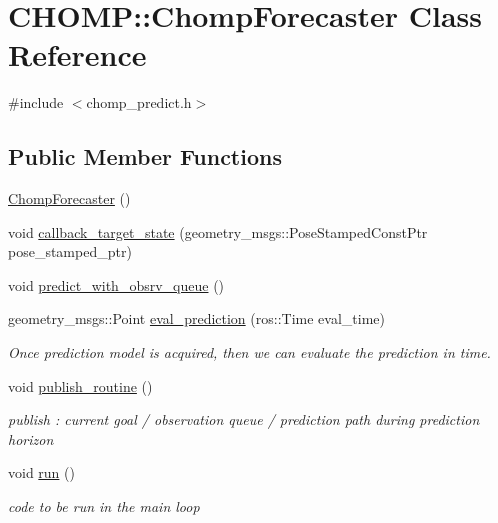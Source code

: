 \hypertarget{class_c_h_o_m_p_1_1_chomp_forecaster}{}\section{C\+H\+O\+MP\+:\+:Chomp\+Forecaster Class Reference}
\label{class_c_h_o_m_p_1_1_chomp_forecaster}


{\ttfamily \#include $<$chomp\+\_\+predict.\+h$>$}

\subsection*{Public Member Functions}
\begin{DoxyCompactItemize}
\item 
\hyperlink{class_c_h_o_m_p_1_1_chomp_forecaster_a58176b34170de8485029f182e05f12c5}{Chomp\+Forecaster} ()
\item 
void \hyperlink{class_c_h_o_m_p_1_1_chomp_forecaster_ac05e634464c8859c8cc3e8bdb1a40ded}{callback\+\_\+target\+\_\+state} (geometry\+\_\+msgs\+::\+Pose\+Stamped\+Const\+Ptr pose\+\_\+stamped\+\_\+ptr)
\item 
void \hyperlink{class_c_h_o_m_p_1_1_chomp_forecaster_a02a3930b78aaf72a9058cb3ce6ae8143}{predict\+\_\+with\+\_\+obsrv\+\_\+queue} ()
\item 
geometry\+\_\+msgs\+::\+Point \hyperlink{class_c_h_o_m_p_1_1_chomp_forecaster_a8b3e5ea0d8a5092b371a23efcddd5c73}{eval\+\_\+prediction} (ros\+::\+Time eval\+\_\+time)
\begin{DoxyCompactList}\small\item\em Once prediction model is acquired, then we can evaluate the prediction in time. \end{DoxyCompactList}\item 
void \hyperlink{class_c_h_o_m_p_1_1_chomp_forecaster_a56e9984f3c85563170c58708aaa97056}{publish\+\_\+routine} ()
\begin{DoxyCompactList}\small\item\em publish \+: current goal / observation queue / prediction path during prediction horizon \end{DoxyCompactList}\item 
void \hyperlink{class_c_h_o_m_p_1_1_chomp_forecaster_af225bf2af3fede364b922e27be410f0b}{run} ()
\begin{DoxyCompactList}\small\item\em code to be run in the main loop \end{DoxyCompactList}\end{DoxyCompactItemize}
